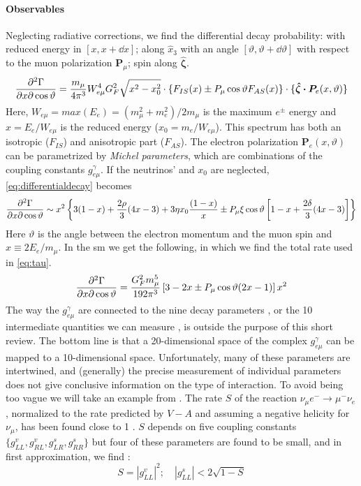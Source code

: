 \begin{refsection}
        \paragraph{Observables} 
        Neglecting radiative corrections, we find the differential decay probability: with reduced energy in $[x,x+\dd x]$; along $\hat{x}_3$ with an angle $[\vartheta,\vartheta+\dd\vartheta]$ with respect to the muon polarization $\pmb{P}_\mu$; spin along $\bm{\hat{\zeta}}$.
        \begin{equation}
            \pdv[2]{\Gamma}{x}{\cos\vartheta}=\frac{m_\mu}{4\pi^3}W^4_{e\mu}G^2_F\sqrt{x^2-x_0^2}\cdot \{F_{IS}(x)\pm P_\mu\cos\vartheta F_{AS}(x)\}\cdot\{\bm{\hat{\zeta}\cdot P}_e(x,\vartheta)\}
            \label{eq:differentialdecay}
        \end{equation}
        Here, $W_{e\mu}=max(E_e)=(m_\mu^2+m_e^2)/2m_\mu$ is the maximum $e^\pm$ energy and $x=E_e/W_{e\mu}$ is the reduced energy ($x_0=m_e/W_{e\mu}$).
        This spectrum has both an isotropic ($F_{IS}$) and anisotropic part ($F_{AS}$). 
        The electron polarization $\bm{P}_e(x,\vartheta)$ can be parametrized by \textit{Michel parameters}, which are combinations of the coupling constants $g^\gamma_{e\mu}$.
        If the neutrinos'  and $x_0$ are neglected, \ref{eq:differentialdecay} becomes
        \begin{equation}
            \pdv[2]{\Gamma}{x}{\cos\vartheta}\sim x^2\left\{ 3(1-x)+\frac{2\rho}{3}(4x-3)+3\eta x_0\frac{(1-x)}{x} \pm P_\mu\xi\cos\vartheta  \left[1-x+\frac{2\delta}{3}(4x-3) \right]\right\}
        \end{equation}
        Here $\vartheta$ is the angle between the electron momentum and the muon spin and $x\equiv2E_e/m_\mu$. 
        In the \gls{sm} we get the following, in which we find the total rate used in \ref{eq:tau}. 
        \begin{equation}
            \pdv[2]{\Gamma}{x}{\cos\vartheta}=\frac{G_F^2 m_\mu^5}{192 \pi^3} \left[ 3-2x \pm P_\mu\cos\vartheta (2x-1) \right]x^2
        \end{equation}
        The way the $g^\gamma_{e\mu}$ are connected to the nine decay parameters \cite{3,10}, or the 10 intermediate quantities we can measure \cite{3}, is outside the purpose of this short review. 
        The bottom line is that a 20-dimensional space of the complex $g^\gamma_{e\mu}$ can be mapped to a 10-dimensional space.
        Unfortunately, many of these parameters are intertwined, and (generally) the precise measurement of individual parameters does not give conclusive information on the type of interaction.
        To avoid being too vague we will take an example from \cite{PSI:review:2021}. 
        The rate $S$ of the reaction $\nu_\mu e^-\rightarrow \mu^-\nu_e$, normalized to the rate predicted by $V-A$ and assuming a negative helicity for $\nu_\mu$, has been found close to 1 \cite{17}.
        $S$ depends on five coupling constants $\{g^v_{LL},g^v_{RL},g^s_{LR},g^s_{RR}\}$ but four of these parameters are found to be small, and in first approximation, we find \cite{7}:
        \begin{equation}
            S=|g^v_{LL}|^2; \quad |g^s_{LL}|<2\sqrt{1-S}
        \end{equation}
    

\end{refsection}

